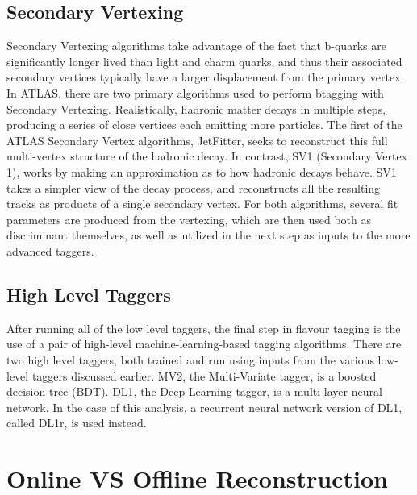         \FloatBarrier
        \subsection{Secondary Vertexing}

            Secondary Vertexing algorithms take advantage of the fact that b-quarks are significantly longer lived than light and charm quarks,
                and thus their associated secondary vertices typically have a larger displacement from the primary vertex.
            In ATLAS, there are two primary algorithms used to perform btagging with Secondary Vertexing.
            Realistically, hadronic matter decays in multiple steps, producing a series of close vertices each emitting more particles.
            The first of the ATLAS Secondary Vertex algorithms, JetFitter, seeks to reconstruct this full multi-vertex structure of the hadronic decay.
            In contrast, SV1 (Secondary Vertex 1), works by making an approximation as to how hadronic decays behave.
            SV1 takes a simpler view of the decay process, and reconstructs all the resulting tracks as products of a single secondary vertex.
            For both algorithms, several fit parameters are produced from the vertexing,
                which are then used both as discriminant themselves,
                as well as utilized in the next step as inputs to the more advanced taggers\cite{btagging_optimisation}.

        \FloatBarrier
        \subsection{High Level Taggers}

            After running all of the low level taggers,
                the final step in flavour tagging is the use of a pair of high-level machine-learning-based tagging algorithms.
            There are two high level taggers, both trained and run using inputs from the various low-level taggers discussed earlier.
            MV2, the Multi-Variate tagger, is a boosted decision tree (BDT).
            DL1, the Deep Learning tagger, is a multi-layer neural network.
            In the case of this analysis, a recurrent neural network version of DL1, called DL1r, is used instead.
            \cite{bjet_id_and_performance}
            \cite{btagging_optimisation}

    \FloatBarrier
    \section{Online VS Offline Reconstruction}

